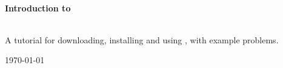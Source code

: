 \begin{titlepage}
\begin{center}



\HRule \\[0.4cm]
{ \huge \bfseries Introduction to \solvername\ \\[0.4cm] }

\HRule \\[1.5cm]

{ \Large A tutorial for downloading, installing and using \solvername, with example problems.\\[0.4cm] }


\vfill

{\large \today}

\end{center}
\end{titlepage}
